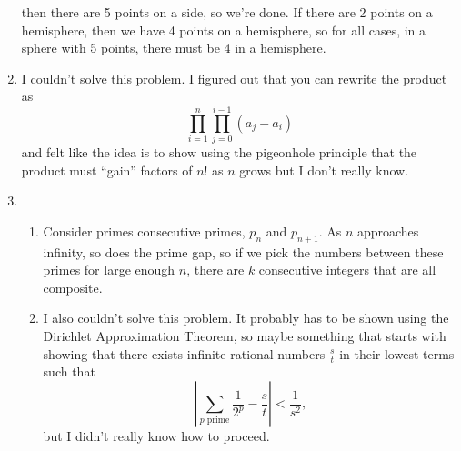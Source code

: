 \documentclass[12pt]{article}
\begin{document}
\begin{enumerate}
    then there are 5 points on a side, so we're done. If there are 2 points on a hemisphere, 
    then we have 4 points on a hemisphere, so for all cases, in a sphere with 5 points, 
    there must be 4 in a hemisphere.
    \item I couldn't solve this problem. I figured out that you can rewrite the 
    product as \[\prod_{i=1}^n\prod_{j=0}^{i-1}(a_j-a_i)\] and felt like the idea 
    is to show using the pigeonhole principle that the product must ``gain'' factors 
    of $n$! as $n$ grows but I don't really know. 
    \item 
    \begin{enumerate}
    \item Consider primes consecutive primes, $p_n$ and $p_{n+1}$. As $n$ approaches 
    infinity, so does the prime gap, so if we pick the numbers between these primes for large enough $n$, 
    there are $k$ consecutive integers that are all composite.
    \item I also couldn't solve this problem. It probably has to be shown using 
    the Dirichlet Approximation Theorem, so maybe something that starts with showing 
    that there exists infinite rational numbers $\frac{s}{t}$ in their lowest terms 
    such that
    \[\left| \sum_{p \text{ prime}}\frac{1}{2^p}-\frac{s}{t} \right| < \frac{1}{s^2},\]
    but I didn't really know how to proceed.
    \end{enumerate}
\end{enumerate}
\end{document}

